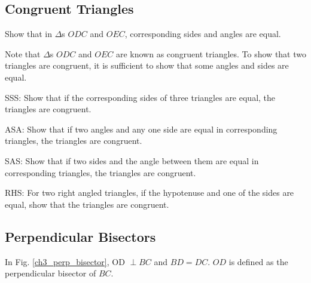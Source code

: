 \subsection{Congruent Triangles}
%
\begin{problem}
	Show that in $\Delta$s $ODC$ and $OEC$, corresponding sides and angles are equal.
\end{problem}
\begin{definition}
	Note that    $\Delta$s $ODC$ and $OEC$ are known as congruent triangles.  To show that two triangles are congruent, it is sufficient to show that some angles and sides are equal.
\end{definition}
\begin{problem}
SSS:	Show that if the corresponding sides of three triangles are equal, the triangles are congruent.
\end{problem}
\begin{problem}
ASA:	Show that if two angles and any one side  are equal in corresponding triangles, the triangles are congruent.
\end{problem}
\begin{problem}
SAS:	Show that if two sides and the angle between them are equal in corresponding triangles, the triangles are congruent.
\end{problem}
\begin{problem}
RHS:	For two right angled triangles, if the hypotenuse and one of the sides are equal, show that the triangles are congruent.
\end{problem}
\subsection{Perpendicular Bisectors}
\begin{definition}
	In Fig. \ref{ch3_perp_bisector}, OD $\perp BC$ and $BD=DC$. $OD$ is defined as the perpendicular bisector of $BC$.
\end{definition}

